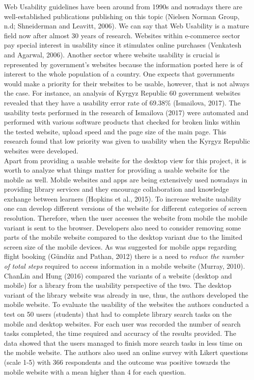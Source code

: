 \documentclass[version=last,fontsize=13pt]{scrartcl}
\begin{document}
\indent
Web Usability guidelines have been around from 1990s and nowadays there are well-established publications publishing on this topic (Nielsen Norman Group, n.d; Shneiderman and Leavitt, 2006). We can say that Web Usability is a mature field now after almost 30 years of research. Websites within e-commerce sector pay  special interest in usability since it stimulates online purchases (Venkatesh and Agarwal, 2006). Another sector where website usability is crucial is represented by government's websites because the information posted here is of interest to the whole population of a country. One expects that governments would make a priority for their websites to be usable, however, that is not always the case. For instance, an analysis of Kyrgyz Republic 60 government websites revealed that they have a usability error rate of 69.38\% (Ismailova, 2017). The usability tests performed in the research of Ismailova (2017) were automated and performed with various software products that checked for broken links within the tested website, upload speed  and the page size of the main page. This research found that low priority was given to usability when the Kyrgyz Republic websites were developed.\\
\indent
	Apart from providing a usable website for the desktop view for this project, it is worth to analyze what things matter for providing a usable website for the mobile  as well. Mobile websites and apps are being extensively used nowadays in providing library services and they encourage collaboration and knowledge exchange between learners (Hopkins et al., 2015). To increase website usability one can develop different versions of the  website for different categories of screen resolution. Therefore, when the user accesses the website from mobile the mobile variant is sent to the browser. Developers also need to consider removing some parts of the mobile website compared to the desktop variant due to the limited screen size of the mobile devices. As was suggested for mobile apps regarding flight booking (Gündüz and Pathan, 2012) there is a need to \textit{reduce the number of total steps} required to access information in a mobile website (Murray, 2010).\\
ChanLin and Hung (2016) compared the variants of a website (desktop and mobile) for a library from the usability perspective of the two. The desktop variant of the library website was already in use, thus, the authors developed the mobile website. To evaluate the usability of the websites the authors conducted a test on 50 users (students) that had to  complete library search tasks on the mobile and desktop websites. For each user was recorded the number of search tasks completed, the time required and accuracy of the results provided. The data showed that the users managed to finish more search tasks in less time on the mobile website. The authors also used an online survey with Likert questions (scale 1-5) with 366 respondents and the outcome was positive towards the mobile website with a mean higher than 4 for each question.
\end{document}

